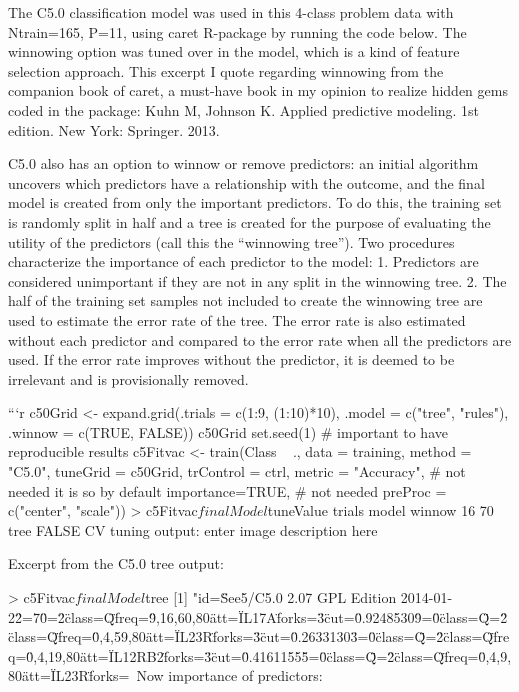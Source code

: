 


The C5.0 classification model was used in this 4-class problem data with Ntrain=165, P=11, using caret R-package by running the code below. The winnowing option was tuned over in the model, which is a kind of feature selection approach. This excerpt I quote regarding winnowing from the companion book of caret, a must-have book in my opinion to realize hidden gems coded in the package:
Kuhn M, Johnson K. Applied predictive modeling. 1st edition. New York: Springer. 2013.

C5.0 also has an option to winnow or remove predictors: an initial algorithm uncovers which predictors have a relationship with the outcome, and the ﬁnal model is created from only the important predictors. To do this, the training set is randomly split in half and a tree is created for the purpose of evaluating the utility of the predictors (call this the “winnowing tree”). Two procedures characterize the importance of each predictor to the model: 1. Predictors are considered unimportant if they are not in any split in the winnowing tree. 2. The half of the training set samples not included to create the winnowing tree are used to estimate the error rate of the tree. The error rate is also estimated without each predictor and compared to the error rate when all the predictors are used. If the error rate improves without the predictor, it is deemed to be irrelevant and is provisionally removed.

```{r}
c50Grid <- expand.grid(.trials = c(1:9, (1:10)*10),
                       .model = c("tree", "rules"),
                       .winnow = c(TRUE, FALSE))
c50Grid
set.seed(1) # important to have reproducible results
c5Fitvac <- train(Class ~ .,
                   data = training,
                   method = "C5.0",
                   tuneGrid = c50Grid,
                   trControl = ctrl,
                   metric = "Accuracy", # not needed it is so by default
                   importance=TRUE, # not needed
                   preProc = c("center", "scale"))  
> c5Fitvac$finalModel$tuneValue
   trials model winnow
16     70  tree  FALSE  
CV tuning output:
enter image description here

Excerpt from the C5.0 tree output:

> c5Fitvac$finalModel$tree
[1] "id=\"See5/C5.0 2.07 GPL Edition 2014-01-22\"\nentries=\"70\"\ntype=\"2\" class=\"Q\" freq=\"9,16,60,80\" att=\"IL17A\" forks=\"3\" cut=\"0.92485309\"\ntype=\"0\" class=\"Q\"\ntype=\"2\" class=\"Q\" freq=\"0,4,59,80\" att=\"IL23R\" forks=\"3\" cut=\"0.26331303\"\ntype=\"0\" class=\"Q\"\ntype=\"2\" class=\"Q\" freq=\"0,4,19,80\" att=\"IL12RB2\" forks=\"3\" cut=\"0.41611555\"\ntype=\"0\" class=\"Q\"\ntype=\"2\" class=\"Q\" freq=\"0,4,9,80\" att=\"IL23R\" forks=\   
Now importance of predictors:

